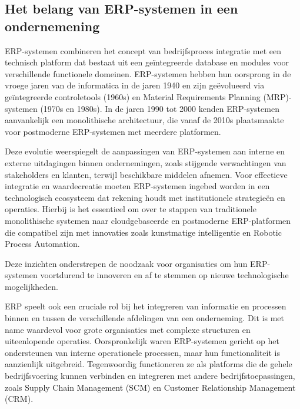 \subsection{Het belang van ERP-systemen in een ondernemening}
\label{sec:Het belang van ERP-systemen in een ondernemening}

ERP-systemen combineren het concept van bedrijfsproces integratie met een technisch platform dat bestaat uit een geïntegreerde database en modules voor verschillende functionele domeinen. ERP-systemen hebben hun oorsprong in de vroege jaren van de informatica in de jaren 1940 en zijn geëvolueerd via geïntegreerde controletools (1960s) en Material Requirements Planning (MRP)-systemen (1970s en 1980s). In de jaren 1990 tot 2000 kenden ERP-systemen aanvankelijk een monolithische architectuur, die vanaf de 2010s plaatsmaakte voor postmoderne ERP-systemen met meerdere platformen. \autocite{katuu2020enterprise}

\vspace{\baselineskip}

Deze evolutie weerspiegelt de aanpassingen van ERP-systemen aan interne en externe uitdagingen binnen ondernemingen, zoals stijgende verwachtingen van stakeholders en klanten, terwijl beschikbare middelen afnemen. Voor effectieve integratie en waardecreatie moeten ERP-systemen ingebed worden in een technologisch ecosysteem dat rekening houdt met institutionele strategieën en operaties. Hierbij is het essentieel om over te stappen van traditionele monolithische systemen naar cloudgebaseerde en postmoderne ERP-platformen die compatibel zijn met innovaties zoals kunstmatige intelligentie en Robotic Process Automation. \autocite{katuu2020enterprise}

\vspace{\baselineskip}

Deze inzichten onderstrepen de noodzaak voor organisaties om hun ERP-systemen voortdurend te innoveren en af te stemmen op nieuwe technologische mogelijkheden.

\vspace{\baselineskip}

ERP speelt ook een cruciale rol bij het integreren van informatie en processen binnen en tussen de verschillende afdelingen van een onderneming. Dit is met name waardevol voor grote organisaties met complexe structuren en uiteenlopende operaties. Oorspronkelijk waren ERP-systemen gericht op het ondersteunen van interne operationele processen, maar hun functionaliteit is aanzienlijk uitgebreid. Tegenwoordig functioneren ze als platforms die de gehele bedrijfsvoering kunnen verbinden en integreren met andere bedrijfstoepassingen, zoals Supply Chain Management (SCM) en Customer Relationship Management (CRM). \autocite{sheik2020enterprise}

